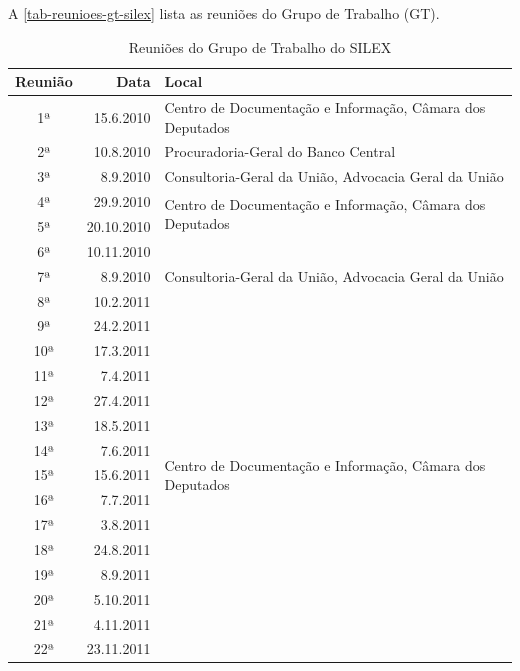 \documentclass[a4paper,11pt,openright,twoside,english,brazil]{abntex2}
\begin{document}
A \autoref{tab-reunioes-gt-silex} lista as reuniões do Grupo de Trabalho (GT).

\begin{table}[htb]
\center
\footnotesize
\caption[Reuniões do Grupo de Trabalho do SILEX]{Reuniões do Grupo de Trabalho do SILEX}
\label{tab-reunioes-gt-silex}
\begin{tabular}{c|r|p{10.0cm}}
   \textbf{Reunião} & \textbf{Data} & \textbf{Local}   \\
    \hline
    1ª & 15.6.2010 & Centro de Documentação e Informação, Câmara dos Deputados
    \\ \hline
     2ª & 10.8.2010 & Procuradoria-Geral do Banco Central
    \\ \hline
    3ª & 8.9.2010 & Consultoria-Geral da União, Advocacia Geral da União
    \\ \hline
    4ª & 29.9.2010 & \multirow{2}{*}{Centro de Documentação e Informação,
    Câmara dos Deputados}
    \\ \cline{1-2}
    5ª & 20.10.2010 
    \\ \cline{1-2}
    6ª & 10.11.2010
    \\ \hline
    7ª & 8.9.2010 & Consultoria-Geral da União, Advocacia Geral da União
    \\ \hline
    8ª & 10.2.2011 & \multirow{26}{*}{Centro de Documentação e Informação,
    Câmara dos Deputados}
    \\ \cline{1-2}
    9ª & 24.2.2011
    \\ \cline{1-2}
    10ª & 17.3.2011
    \\ \cline{1-2}
    11ª & 7.4.2011
    \\ \cline{1-2}
    12ª & 27.4.2011
    \\ \cline{1-2}
    13ª & 18.5.2011
    \\ \cline{1-2}
    14ª & 7.6.2011
    \\ \cline{1-2}
    15ª & 15.6.2011
    \\ \cline{1-2}
    16ª & 7.7.2011
    \\ \cline{1-2}
    17ª & 3.8.2011
    \\ \cline{1-2}
    18ª & 24.8.2011
    \\ \cline{1-2}
    19ª & 8.9.2011
    \\ \cline{1-2}
    20ª & 5.10.2011
    \\ \cline{1-2}
    21ª & 4.11.2011
    \\ \cline{1-2}
    22ª & 23.11.2011
    \\ \cline{1-2}

\end{tabular}
\end{table}
\end{document}
